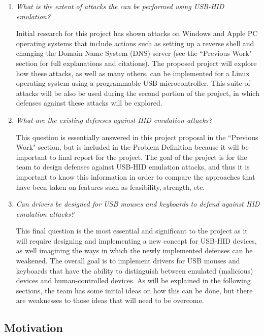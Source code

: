 \documentclass[pagenumbers]{ieee}
\begin{document}
\begin{enumerate}
\item \textit{What is the extent of attacks the can be performed using USB-HID emulation?}

Initial research for this project has shown attacks on Windows and Apple PC operating systems that include actions such as setting up a reverse shell and changing the Domain Name System (DNS) server (see the ``Previous Work" section for full explanations and citations). The proposed project will explore how these attacks, as well as many others, can be implemented for a  Linux operating system using a programmable USB microcontroller. This suite of attacks will be also be used during the second portion of the project, in which defenses against these attacks will be explored.

\item \textit{What are the existing defenses against HID emulation attacks?}

This question is essentially answered in this project proposal in the ``Previous Work" section, but is included in the Problem Definition because it will be important to final report for the project. The goal of the project is for the team to design defenses against USB-HID emulation attacks, and thus it is important to know this information  in order to compare the approaches that have been taken on features such as feasibility, strength, etc.

\item \textit{Can drivers be designed for USB mouses and keyboards to defend against HID emulation attacks?}

This final question is the most essential and significant to the project as it will require designing and implementing a new concept for USB-HID devices, as well imagining the ways in which the newly implemented defenses can be weakened. The overall goal is to implement drivers for USB mouses and keyboards that have the ability to distinguish between emulated (malicious) devices and human-controlled devices. As will be explained in the following sections, the team has some initial ideas on how this can be done, but there are weaknesses to those ideas that will need to be overcome.

\end{enumerate}


\subsection{Motivation}
\label{section:motivation}
\end{document}

